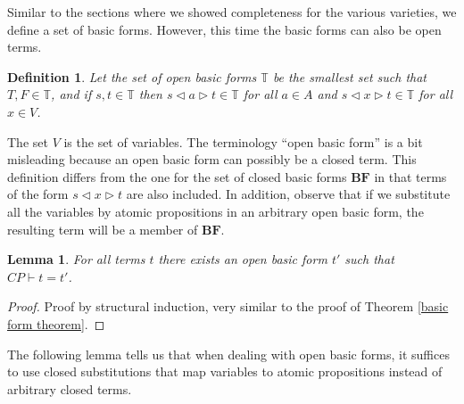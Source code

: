 \documentclass[a4paper,twoside,openright]{report}
\newcommand{\BF}{\ensuremath{\textbf{BF}}}
\newcommand{\lef}{\ensuremath{\triangleleft}}
\newcommand{\rig}{\ensuremath{\triangleright}}
\newtheorem{lem}[theorem]{Lemma}
\newtheorem{defn}[theorem]{Definition}
\begin{document}
Similar to the sections where we showed completeness for the various varieties, we define a set of basic forms. However, this time the basic forms can also be open terms.
\begin{defn}\label{open basic form def}
Let the set of open basic forms $\mathbb{T}$ be the smallest set such that $T, F\in\mathbb{T}$, and if $s, t\in\mathbb{T}$ then $s\lef a\rig t\in\mathbb{T}$ for all $a\in A$ and $s\lef x\rig t\in\mathbb{T}$ for all $x\in V$.
\end{defn}
The set $V$ is the set of variables. The terminology ``open basic form'' is a bit misleading because an open basic form can possibly be a closed term. This definition differs from the one for the set of closed basic forms \BF{} in that terms of the form $s\lef x\rig t$ are also included. In addition, observe that if we substitute all the variables by atomic propositions in an arbitrary open basic form, the resulting term will be a member of \BF.

\begin{lem}\label{open basic form lem}
For all terms $t$ there exists an open basic form $t'$ such that $CP\vdash t=t'$.
\end{lem}
\begin{proof}
Proof by structural induction, very similar to the proof of Theorem \ref{basic form theorem}.
\end{proof}

The following lemma tells us that when dealing with open basic forms, it suffices to use closed substitutions that map variables to atomic propositions instead of arbitrary closed terms.
\end{document}
